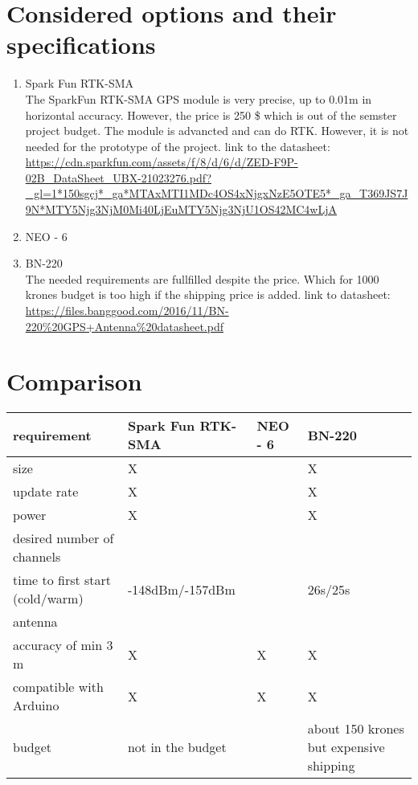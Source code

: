 \documentclass{article}[10pt]
\begin{document}
\section{Considered options and their specifications}
\begin{enumerate}
    \item Spark Fun RTK-SMA\\
    The SparkFun RTK-SMA GPS module is very precise, up to 0.01m in horizontal accuracy. However,
    the price is 250 \$ which is out of the semster project budget. The module is advancted and can do RTK. 
    However, it is not needed for the prototype of the project.
    link to the datasheet: \url{https://cdn.sparkfun.com/assets/f/8/d/6/d/ZED-F9P-02B_DataSheet_UBX-21023276.pdf?_gl=1*150sgcj*_ga*MTAxMTI1MDc4OS4xNjgxNzE5OTE5*_ga_T369JS7J9N*MTY5Njg3NjM0Mi40LjEuMTY5Njg3NjU1OS42MC4wLjA}
       
    \item NEO - 6\\
    \item BN-220\\
    The needed requirements are fullfilled despite the price. Which for 1000 krones budget is too high if the shipping price is added.
link to datasheet: \url{https://files.banggood.com/2016/11/BN-220%20GPS+Antenna%20datasheet.pdf}

\end{enumerate}

\section{Comparison}
\begin{center}
    \begin{tabularx}{0.8\textwidth}{
    | >{\centering\arraybackslash}X 
    | >{\centering\arraybackslash}X 
    | >{\centering\arraybackslash}X  
    | >{\centering\arraybackslash}X | }

    \hline
    requirement&Spark Fun RTK-SMA&NEO - 6&BN-220 \\
    \hline
    size&X&&X\\
    \hline
    update rate&X&&X\\
    \hline
    power&X&&X\\
    \hline
    desired number of channels&&&72\\
    \hline
    time to first start (cold/warm)&-148dBm/-157dBm&&26s/25s\\
    \hline
    antenna&&&\\
    \hline
    accuracy of min 3 m&X&X&X\\
    \hline
    compatible with Arduino&X&X&X\\
    \hline
    budget&not in the budget&&about 150 krones but expensive shipping\\
    \hline
\end{tabularx}
\end{center}
\end{document}
